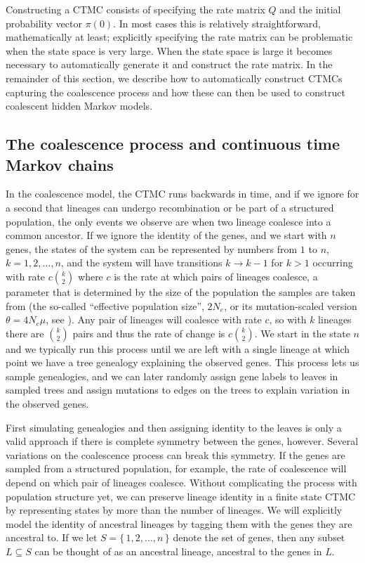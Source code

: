 \documentclass[graybox]{svmult}
\begin{document}
Constructing a CTMC consists of specifying the rate matrix $Q$ and the initial probability vector $\pi(0)$. In most cases this is relatively straightforward, mathematically at least; explicitly specifying the rate matrix can be problematic when the state space is very large. When the state space is large it becomes necessary to automatically generate it and construct the rate matrix. In the remainder of this section, we describe how to automatically construct CTMCs capturing the coalescence process and how these can then be used to construct coalescent hidden Markov models.

\subsection{The coalescence process and continuous time Markov chains}

In the coalescence model, the CTMC runs backwards in time, and if we ignore for a second that lineages can undergo recombination or be part of a structured population, the only events we observe are when two lineage coalesce into a common ancestor. If we ignore the identity of the genes, and we start with $n$ genes, the states of the system can be represented by numbers from $1$ to $n$, $k=1,2,\ldots,n$, and the system will have transitions $k\to k-1$ for $k>1$ occurring with rate $c{k \choose 2}$ where $c$ is the rate at which pairs of lineages coalesce, a parameter that is determined by the size of the population the samples are taken from (the so-called ``effective population size'', $2N_e$, or its mutation-scaled version $\theta=4 N_e \mu$, see \citet{Hein:2004ta}). Any pair of lineages will coalesce with rate $c$, so with $k$ lineages there are $k \choose 2$ pairs and thus the rate of change is $c{k \choose 2}$. We start in the state $n$ and we typically run this process until we are left with a single lineage at which point we have a tree genealogy explaining the observed genes. This process lets us sample genealogies, and we can later randomly assign gene labels to leaves in sampled trees and assign mutations to edges on the trees to explain variation in the observed genes.


First simulating genealogies and then assigning identity to the leaves is only a valid approach if there is complete symmetry between the genes, however. Several variations on the coalescence process can break this symmetry. If the genes are sampled from a structured population, for example, the rate of coalescence will depend on which pair of lineages coalesce. Without complicating the process with population structure yet, we can preserve lineage identity in a finite state CTMC by representing states by more than the number of lineages. We will explicitly model the identity of ancestral lineages by tagging them with the genes they are ancestral to. If we let $S=\{\,1,2,\ldots,n\,\}$ denote the set of genes, then any subset $L\subseteq S$ can be thought of as an ancestral lineage, ancestral to the genes in $L$.
\end{document}
